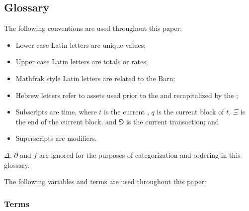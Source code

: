 \documentclass[class=article, crop=false]{standalone}
\begin{document}
\subsection{Glossary}
The following conventions are used throughout this paper:
\begin{itemize}
    \item Lower case Latin letters are unique values;
    \item Upper case Latin letters are totals or rates;
    \item Mathfrak style Latin letters are related to the Barn; 
    \item Hebrew letters refer to assets used prior to the  and recapitalized by the ;
    \item Subscripts are time, where $t$ is the current , $q$ is the current block of $t$, \hypertarget{ht1}{$\Xi$} is the end of the current block, and $\Game$ is the current transaction; and
    \item Superscripts are modifiers.
\end{itemize}

$\Delta$, $\partial$ and $f$ are ignored for the purposes of categorization and ordering in this glossary. 

The following variables and terms are used throughout this paper:

\subsubsection{Terms}
\end{document}
